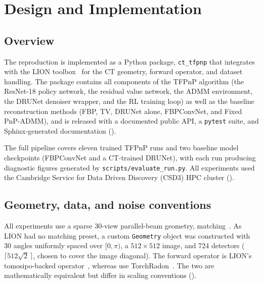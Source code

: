 
\chapter{Design and Implementation}
\label{chap:implementation}

\section{Overview}
\label{sec:overview}

The reproduction is implemented as a Python package, \texttt{ct\_tfpnp} that integrates with the LION toolbox~\citep{Biguri2024LION} for the CT geometry, forward operator, and dataset handling. The package contains all components of the TFPnP algorithm (the ResNet-18 policy network, the residual value network, the ADMM environment, the DRUNet denoiser wrapper, and the RL training loop) as well as the baseline reconstruction methods (FBP, TV, DRUNet alone, FBPConvNet, and Fixed PnP-ADMM), and is released with a documented public API, a \texttt{pytest} suite, and Sphinx-generated documentation ().

The full pipeline covers eleven trained TFPnP runs and two baseline model checkpoints (FBPConvNet and a CT-trained DRUNet), with each run producing diagnostic figures generated by \texttt{scripts/evaluate\_run.py}. All experiments used the Cambridge Service for Data Driven Discovery (CSD3) HPC cluster ().

\section{Geometry, data, and noise conventions}
\label{sec:geometry-noise}

All experiments use a sparse 30-view parallel-beam geometry, matching~\citet{Wei2022TFPnP}. As LION had no matching preset, a custom \texttt{Geometry} object was constructed with 30 angles uniformly spaced over $[0, \pi)$, a $512 \times 512$ image, and 724 detectors ($\lceil 512\sqrt{2}\,\rceil$, chosen to cover the image diagonal). The forward operator is LION's tomosipo-backed operator~\citep{Hendriksen2021Tomosipo}, whereas \citet{Wei2022TFPnP} use TorchRadon~\citep{Ronchetti2020TorchRadon}. The two are mathematically equivalent but differ in scaling conventions ().

